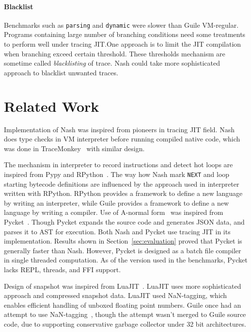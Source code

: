\documentclass[preprint, 10pt]{sigplanconf}
\begin{document}
\paragraph{Blacklist} Benchmarks such as \texttt{parsing} and
\texttt{dynamic} were slower than Guile VM-regular. Programs containing large
number of branching conditions need some treatments to perform well under
tracing JIT.\@ One approach is to limit the JIT compilation when branching
exceed certain threshold. These thresholds mechanism are sometime called
\textit{blacklisting} of trace. Nash could take more sophisticated approach to
blacklist unwanted traces.

\section{Related Work}
\label{sec:related}
Implementation of Nash was inspired from pioneers in tracing JIT field. Nash
does type checks in VM interpreter before running compiled native code, which
was done in TraceMonkey~\cite{gal2009trace} with similar design.

The mechanism in interpreter to record instructions and detect hot loops are
inspired from Pypy and RPython~\cite{bolz2009tracing}. The way how Nash mark
\texttt{NEXT} and loop starting bytecode definitions are influenced by the
approach used in interpreter written with RPython.  RPython provides a
framework to define a new language by writing an interpreter, while Guile
provides a framework to define a new language by writing a compiler.  Use of
A-normal form~\cite{flanagan1993essence} was inspired from
Pycket~\cite{bauman2015pycket}. Though Pycket expands the source code and
generates JSON data, and parses it to AST for execution. Both Nash and Pycket
use tracing JIT in its implementation. Results shown in
Section~\ref{sec:evaluation} proved that Pycket is generally faster than Nash.
However, Pycket is designed as a batch file compiler in single threaded
computation. As of the version used in the benchmarks, Pycket lacks REPL,
threads, and FFI support.

Design of snapshot was inspired from LuaJIT~\cite{pall2009ip}. LuaJIT uses
more sophisticated approach and compressed snapshot data. LuaJIT used
NaN-tagging, which enables efficient handling of unboxed floating point
numbers. Guile once had an attempt to use NaN-tagging~\cite{wingo2011value},
though the attempt wasn't merged to Guile source code, due to supporting
conservative garbage collector under 32 bit architectures.
\end{document}
